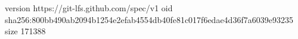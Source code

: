 version https://git-lfs.github.com/spec/v1
oid sha256:800bb490ab2094b1254e2efab4554db40fe81c017f6edae4d36f7a6039e93235
size 171388
